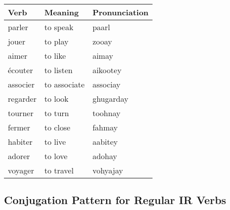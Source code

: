 \begin{longtable}{| l | l | l |}
\hline
Verb 		& Meaning 		& Pronunciation	\\
\hline
\endhead
parler		& to speak		& paarl			\\ 	\hline
jouer		& to play		& zooay			\\	\hline
aimer		& to like		& aimay			\\	\hline
\'ecouter	& to listen		& aikootey		\\	\hline
associer	& to associate	& associay		\\	\hline
regarder	& to look		& ghugarday		\\	\hline
tourner		& to turn		& toohnay		\\	\hline
fermer		& to close		& fahmay		\\	\hline
habiter		& to live		& aabitey		\\	\hline
adorer 		& to love		& adohay		\\	\hline
voyager 	& to travel		& vohyajay		\\	\hline


\end{longtable}

\subsection{Conjugation Pattern for Regular IR Verbs}